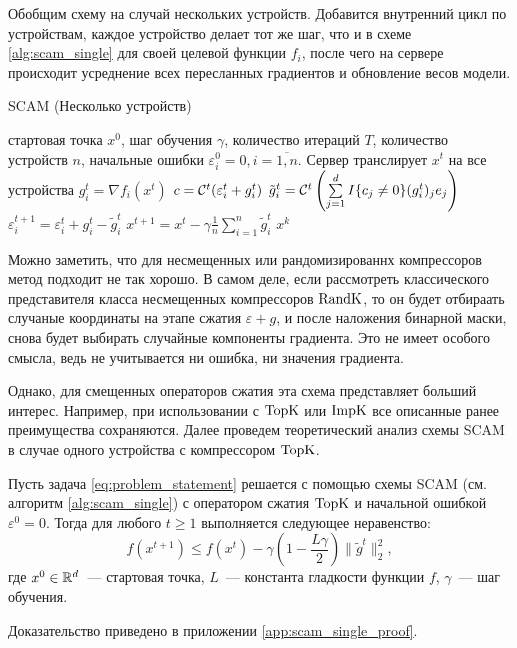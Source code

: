     Обобщим схему на случай нескольких устройств. Добавится внутренний цикл по устройствам, каждое устройство делает тот же шаг, что и в схеме \ref{alg:scam_single} для своей целевой функции $f_i$, после чего на сервере происходит усреднение всех пересланных градиентов и обновление весов модели.

    \begin{algorithm}[H]
        \caption{SCAM (Несколько устройств)}
        \label{alg:scam_multi}
        \begin{algorithmic}[1]
             стартовая точка $x^0$, шаг обучения $\gamma$, количество итераций $T$, количество устройств $n$, начальные ошибки $\varepsilon_i^0 = 0, i = \overline{1, n}$.
                \STATE Сервер транслирует $x^t$ на все устройства
                    \STATE $g_i^t = \nabla f_i(x^t)$
                    \STATE $c = {\cal C}^t (\varepsilon_i^t + g_i^t)$
                    \STATE $\tilde{g}_i^t = {\cal C}^t \left(\sum\limits_{j=1}^{d} I\{c_j \neq 0\} (g_i^t)_j e_j\right)$
                    \STATE $\varepsilon_i^{t + 1} = \varepsilon_i^{t} + g_i^t - \tilde{g}_i^t$
                \ENDFOR
                \STATE $x^{t+1} = x^t - \gamma \frac{1}{n} \sum\limits_{i = 1}^n \tilde{g}_i^t$
            \ENDFOR
             $x^k$
        \end{algorithmic}
    \end{algorithm}

    Можно заметить, что для несмещенных или рандомизированнх компрессоров метод подходит не так хорошо. В самом деле, если рассмотреть классического представителя класса несмещенных компрессоров $\operatorname{RandK}$, то он будет отбираать случаные координаты на этапе сжатия $\varepsilon + g$, и после наложения бинарной маски, снова будет выбирать случайные компоненты градиента. Это не имеет особого смысла, ведь не учитывается ни ошибка, ни значения градиента.

    Однако, для смещенных операторов сжатия эта схема представляет больший интерес. Например, при использовании с $\operatorname{TopK}$ или $\operatorname{ImpK}$ все описанные ранее преимущества сохраняются. Далее проведем теоретический анализ схемы SCAM в случае одного устройства с компрессором $\operatorname{TopK}$.

    \begin{theorem}\label{th:scam_single}
        Пусть задача \eqref{eq:problem_statement} решается с помощью схемы SCAM (см. алгоритм \ref{alg:scam_single}) с оператором сжатия $\operatorname{TopK}$ и начальной ошибкой $\varepsilon^0 = 0$. Тогда для любого $t \geq 1$ выполняется следующее неравенство:
        \begin{equation}
            f(x^{t + 1}) \leq f(x^t) - \gamma \left(1 - \frac{L \gamma}{2}\right) \|\tilde{g}^t\|_2^2,
        \end{equation}
        где $x^0 \in \mathbb{R}^d$~--- стартовая точка, $L$~--- константа гладкости функции $f$, $\gamma$~--- шаг обучения.
    \end{theorem}
    Доказательство приведено в приложении \ref{app:scam_single_proof}.
    

